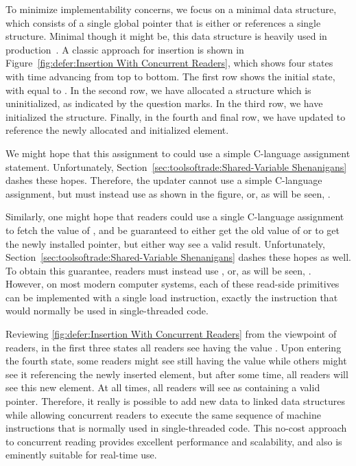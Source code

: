 To minimize implementability concerns, we focus on a minimal
data structure, which consists of a single global pointer that is either
 or references a single structure.
Minimal though it might be, this data structure is heavily used in
production~\cite{GeoffRomer2018C++DeferredReclamationP0561R4}.
A classic approach for insertion is shown in
Figure~\ref{fig:defer:Insertion With Concurrent Readers},
which shows four states with time advancing from top to bottom.
The first row shows the initial state, with  equal to .
In the second row, we have allocated a structure which is uninitialized,
as indicated by the question marks.
In the third row, we have initialized the structure.
Finally, in the fourth and final row, we have updated  to
reference the newly allocated and initialized element.

We might hope that this assignment to  could use a simple
C-language assignment statement.
Unfortunately,
Section~\ref{sec:toolsoftrade:Shared-Variable Shenanigans}
dashes these hopes.
Therefore, the updater cannot use a simple C-language assignment, but
must instead use  as shown in the figure,
or, as will be seen, .

Similarly, one might hope that readers could use a single C-language
assignment to fetch the value of , and be guaranteed to either
get the old value of  or to get the newly installed pointer,
but either way see a valid result.
Unfortunately, Section~\ref{sec:toolsoftrade:Shared-Variable Shenanigans}
dashes these hopes as well.
To obtain this guarantee, readers must instead use ,
or, as will be seen, .
However, on most modern computer systems, each of these read-side primitives
can be implemented with a single load instruction, exactly the instruction
that would normally be used in single-threaded code.

Reviewing \cref{fig:defer:Insertion With Concurrent Readers}
from the viewpoint of readers, in the first three states all readers
see  having the value .
Upon entering the fourth state, some readers might see  still
having the value  while others might see it referencing the
newly inserted element, but after some time, all readers will see this
new element.
At all times, all readers will see  as containing a valid pointer.
Therefore, it really is possible to add new data to linked data structures
while allowing concurrent readers to execute the same sequence of machine
instructions that is normally used in single-threaded code.
This no-cost approach to concurrent reading provides excellent performance
and scalability, and also is eminently suitable for real-time use.

